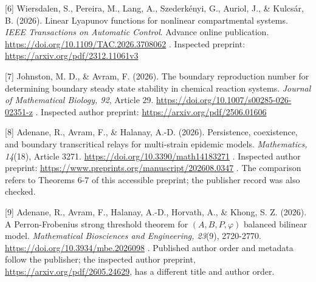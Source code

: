 \documentclass[
  11pt,
  a4paper,
]{scrartcl}
\begin{document}
{[}6{]} Wiersdalen, S., Pereira, M., Lang, A., Szederkényi, G., Auriol,
J., \& Kulcsár, B. (2026). Linear Lyapunov functions for nonlinear
compartmental systems. \emph{IEEE Transactions on Automatic Control}.
Advance online publication.
\url{https://doi.org/10.1109/TAC.2026.3708062} . Inspected preprint:
\url{https://arxiv.org/pdf/2312.11061v3}

{[}7{]} Johnston, M. D., \& Avram, F. (2026). The boundary reproduction
number for determining boundary steady state stability in chemical
reaction systems. \emph{Journal of Mathematical Biology, 92}, Article
29. \url{https://doi.org/10.1007/s00285-026-02351-z} . Inspected author
preprint: \url{https://arxiv.org/pdf/2506.01606}

{[}8{]} Adenane, R., Avram, F., \& Halanay, A.-D. (2026). Persistence,
coexistence, and boundary transcritical relays for multi-strain epidemic
models. \emph{Mathematics, 14}(18), Article 3271.
\url{https://doi.org/10.3390/math14183271} . Inspected author preprint:
\url{https://www.preprints.org/manuscript/202608.0347} . The comparison
refers to Theorems 6-7 of this accessible preprint; the publisher record
was also checked.

{[}9{]} Adenane, R., Avram, F., Halanay, A.-D., Horvath, A., \& Khong,
S. Z. (2026). A Perron-Frobenius strong threshold theorem for
\((A,B,P,\varphi)\) balanced bilinear model. \emph{Mathematical
Biosciences and Engineering, 23}(9), 2720-2770.
\url{https://doi.org/10.3934/mbe.2026098} . Published author order and
metadata follow the publisher; the inspected author preprint,
\url{https://arxiv.org/pdf/2605.24629}, has a different title and author
order.
\end{document}
